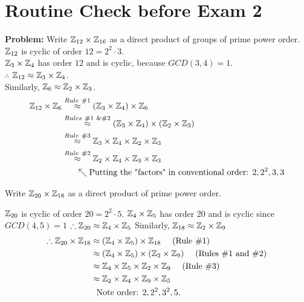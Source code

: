 \section*{Routine Check before Exam 2}
\begin{example}
\textbf{Problem:} Write ${\mathbb{ Z}}_{12}\times {\mathbb{ Z}}_{16}$ as a direct product of groups of prime power order. \steezybreak\\
${\mathbb{ Z}}_{12}$ is cyclic of order $12=2^2\cdot 3$.\\
${\mathbb{ Z}}_3\times {\mathbb{ Z}}_4$ has order $12$ and is cyclic, because $GCD(3,4)=1$.\\
$\therefore$ ${\mathbb{ Z}}_{12}\approx {\mathbb{ Z}}_3\times {\mathbb{ Z}}_4$. \\
Similarly, ${\mathbb{ Z}}_6 \approx {\mathbb{ Z}}_2\times {\mathbb{ Z}}_3$. \\
\begin{align}
    {\mathbb{ Z}}_{12}\times {\mathbb{ Z}}_6 &\overset{Rule\ \# 1}{\approx} ({\mathbb{ Z}}_3\times {\mathbb{ Z}}_4)\times {\mathbb{ Z}}_6 \nonumber \\
    &\overset{Rules \ \# 1 \ \& \#2}{\approx} ({\mathbb{ Z}}_3\times {\mathbb{ Z}}_4)\times({\mathbb{ Z}}_2\times {\mathbb{ Z}}_3) \nonumber \\
    &\overset{Rule \ \#3}{\approx} {\mathbb{ Z}}_3\times {\mathbb{ Z}}_4\times{\mathbb{ Z}}_2\times {\mathbb{ Z}}_3 \nonumber \\
    &\overset{Rule \ \#2}{\approx} {\mathbb{ Z}}_2\times {\mathbb{ Z}}_4\times {\mathbb{ Z}}_3\times  {\mathbb{ Z}}_3 \nonumber \\
    & \ \ \ \ \ \nwarrow \text{Putting the "factors" in conventional order: } 2,2^2,3,3 \nonumber
\end{align}
\end{example}

\begin{example}
Write ${\mathbb{ Z}}_{20}\times {\mathbb{ Z}}_{18}$ as a direct product of prime power order.

${\mathbb{ Z}}_{20}$ is cyclic of order $20=2^2\cdot 5$.
${\mathbb{ Z}}_4\times{\mathbb{ Z}}_5$ has order 20 and is cyclic since $GCD(4,5)=1$
$\therefore {\mathbb{ Z}}_{20}\approx {\mathbb{ Z}}_4\times {\mathbb{ Z}}_5$
Similarly, ${\mathbb{ Z}}_{18}\approx {\mathbb{ Z}}_2\times {\mathbb{ Z}}_9$
\begin{align}
    \therefore \Z_{20}\times \Z_{18} &\approx (\Z_4\times \Z_5)\times \Z_{18} \ \ \ \ \text{(Rule \#1)} \nonumber \\
    &\approx (\Z_4\times \Z_5)\times (\Z_{2}\times \Z_9) \ \ \ \ \text{(Rules \#1 and \#2)} \nonumber \\
    &\approx \Z_4\times \Z_5\times \Z_{2}\times \Z_9 \ \ \ \ \text{(Rule \#3)} \nonumber \\
    &\approx \Z_2\times \Z_4\times \Z_9 \times \Z_5 \nonumber \\
    & \ \ \text{Note order: }2,2^2, 3^2, 5. \nonumber
\end{align}
\end{example}

